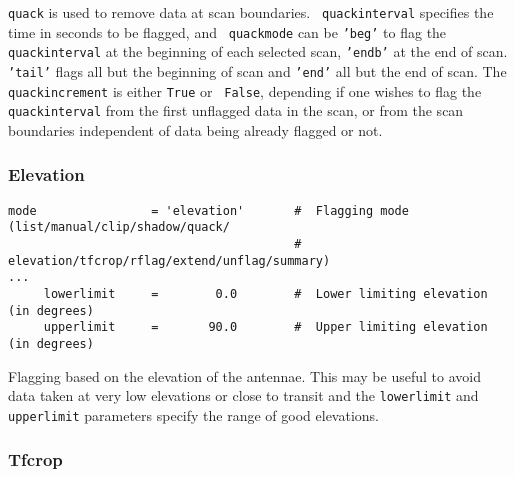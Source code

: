 {\tt quack} is used to remove data at scan boundaries. {\tt
  quackinterval} specifies the time in seconds to be flagged, and {\tt
  quackmode} can be {\tt 'beg'} to flag the {\tt quackinterval} at the
beginning of each selected scan, {\tt 'endb'} at the end of scan. {\tt
  'tail'} flags all but the beginning of scan and {\tt 'end'} all but
the end of scan. The {\tt quackincrement} is either {\tt True} or {\tt
  False}, depending if one wishes to flag the {\tt quackinterval} from
the first unflagged data in the scan, or from the scan boundaries
independent of data being already flagged or not.

\subsubsection{Elevation}
\label{section:edit.flagdata.mode.elevation}

\small
\begin{verbatim}
mode                = 'elevation'       #  Flagging mode (list/manual/clip/shadow/quack/
                                        #   elevation/tfcrop/rflag/extend/unflag/summary)
...
     lowerlimit     =        0.0        #  Lower limiting elevation (in degrees)
     upperlimit     =       90.0        #  Upper limiting elevation (in degrees)
\end{verbatim}
\normalsize

Flagging based on the elevation of the antennae. This may be useful to
avoid data taken at very low elevations or close to transit and the
{\tt lowerlimit} and {\tt upperlimit} parameters specify the range of
good elevations.


\subsubsection{Tfcrop}
\label{section:edit.flagdata.mode.tfcrop}

